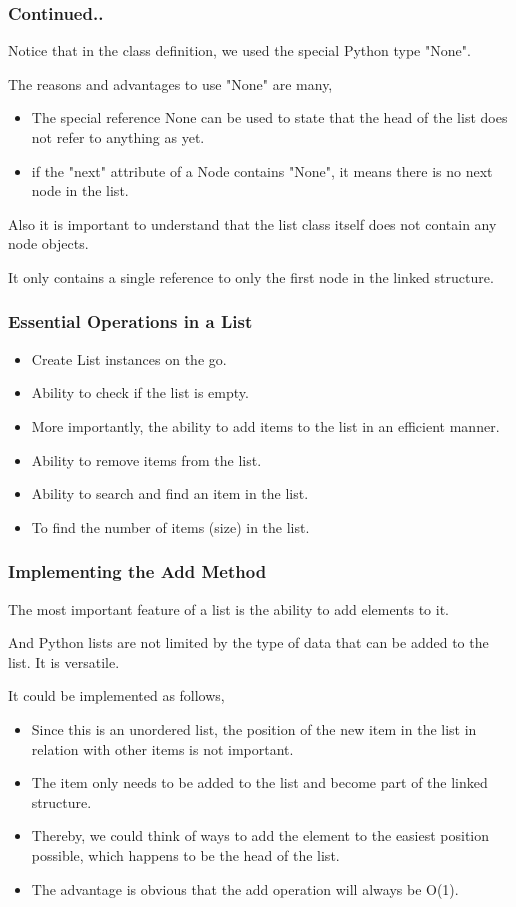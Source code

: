 \documentclass{beamer}
\begin{document}
\begin{frame}
\frametitle{Continued..}
Notice that in the class definition, we used the special Python type "None".

The reasons and advantages to use "None" are many,

\begin{itemize}
\item The special reference None can be used to state that the head of the list does not refer to anything as yet.

\item if the "next" attribute of a Node contains "None", it means there is  no next node in the list.
\end{itemize}
Also it is important to understand that the list class itself does not contain any node objects. 

It only contains a single reference to only the first node in the linked structure.

\end{frame}

\begin{frame}
\frametitle{Essential Operations in a List}

\begin{itemize}
\item Create List instances on the go.
\item Ability to check if the list is empty.
\item More importantly, the ability to add items to the list in an efficient manner.
\item Ability to remove items from the list.
\item Ability to search and find an item in the list.
\item To find the number of items (size) in the list.
\end{itemize}
\end{frame}

\begin{frame}
\frametitle{Implementing the Add Method}
The most important feature of a list is the ability to add elements to it. 

And Python lists are not limited by the type of data that can be added to the list. It is versatile.

It could be implemented as follows, 
\begin{itemize}

\item Since this is an unordered list, the position of the new item in the list in relation with other items is not important.

\item The item only needs to be added to the list and become part of the linked structure.

\item Thereby, we could think of ways to add the element to the easiest position possible, which happens to be the head of the list.

\item The advantage is obvious that the add operation will always be O(1).

\end{itemize}
\end{frame}
\end{document}
